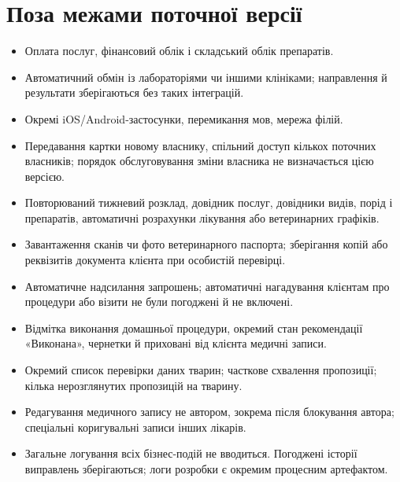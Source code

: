 \documentclass[11pt,a4paper]{article}
\begin{document}
\section{Поза межами поточної версії}
\begin{itemize}
\item Оплата послуг, фінансовий облік і складський облік препаратів.
\item Автоматичний обмін із лабораторіями чи іншими клініками; направлення й результати зберігаються без таких інтеграцій.
\item Окремі iOS/Android-застосунки, перемикання мов, мережа філій.
\item Передавання картки новому власнику, спільний доступ кількох поточних власників; порядок обслуговування зміни власника не визначається цією версією.
\item Повторюваний тижневий розклад, довідник послуг, довідники видів, порід і препаратів, автоматичні розрахунки лікування або ветеринарних графіків.
\item Завантаження сканів чи фото ветеринарного паспорта; зберігання копій або реквізитів документа клієнта при особистій перевірці.
\item Автоматичне надсилання запрошень; автоматичні нагадування клієнтам про процедури або візити не були погоджені й не включені.
\item Відмітка виконання домашньої процедури, окремий стан рекомендації «Виконана», чернетки й приховані від клієнта медичні записи.
\item Окремий список перевірки даних тварин; часткове схвалення пропозиції; кілька нерозглянутих пропозицій на тварину.
\item Редагування медичного запису не автором, зокрема після блокування автора; спеціальні коригувальні записи інших лікарів.
\item Загальне логування всіх бізнес-подій не вводиться. Погоджені історії виправлень зберігаються; логи розробки є окремим процесним артефактом.
\end{itemize}
\end{document}
